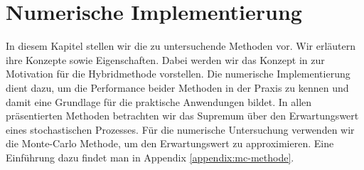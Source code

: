 \documentclass[12pt,titlepage,headsepline]{article}
\begin{document}
    \section{Numerische Implementierung}
      In diesem Kapitel stellen wir die zu untersuchende Methoden vor. Wir erläutern ihre Konzepte sowie Eigenschaften. Dabei werden wir das Konzept in \cite{becker_deep_2019} zur Motivation für die Hybridmethode vorstellen. Die numerische Implementierung dient dazu, um die Performance beider Methoden in der Praxis zu kennen und damit eine Grundlage für die praktische Anwendungen bildet. In allen präsentierten Methoden betrachten wir das Supremum über den Erwartungswert eines stochastischen Prozesses. Für die numerische Untersuchung verwenden wir die Monte-Carlo Methode, um den Erwartungswert zu approximieren. Eine Einführung dazu findet man in Appendix \ref{appendix:mc-methode}.
\end{document}
